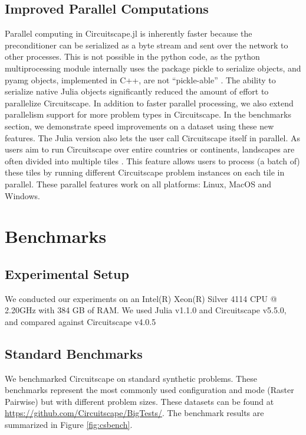 \documentclass{juliacon}
\begin{document}
\subsection{Improved Parallel Computations}


Parallel computing in Circuitscape.jl is inherently faster because the preconditioner can be serialized as a byte stream and sent over the network to other processes. This is not possible in the python code, as the python multiprocessing module internally uses the package pickle to serialize objects, and pyamg objects, implemented in C++, are not “pickle-able” \cite{pydoc}. The ability to serialize native Julia objects significantly reduced the amount of effort to parallelize Circuitscape.
In addition to faster parallel processing, we also extend parallelism support for more problem types in Circuitscape. In the benchmarks section, we demonstrate speed improvements on a dataset using these new features. The Julia version also lets the user call Circuitscape itself in parallel. As users aim to run Circuitscape over entire countries or continents, landscapes are often divided into multiple tiles \cite{pelletier2014applying}. This feature allows users to process (a batch of) these tiles by running different Circuitscape problem instances on each tile in parallel. These parallel features work on all platforms: Linux, MacOS and Windows. 

\section{Benchmarks}

\subsection{Experimental Setup}
We conducted our experiments on an Intel(R) Xeon(R) Silver 4114 CPU @ 2.20GHz with 384 GB of RAM. We used Julia v1.1.0 and Circuitscape v5.5.0, and compared against Circuitscape v4.0.5 

\subsection{Standard Benchmarks}
We benchmarked Circuitscape on standard synthetic problems. These benchmarks represent the most commonly used configuration and mode (Raster Pairwise) but with different problem sizes. These datasets can be found at \url{https://github.com/Circuitscape/BigTests/}. The benchmark results are summarized in Figure \ref{fig:csbench}. 
\end{document}
